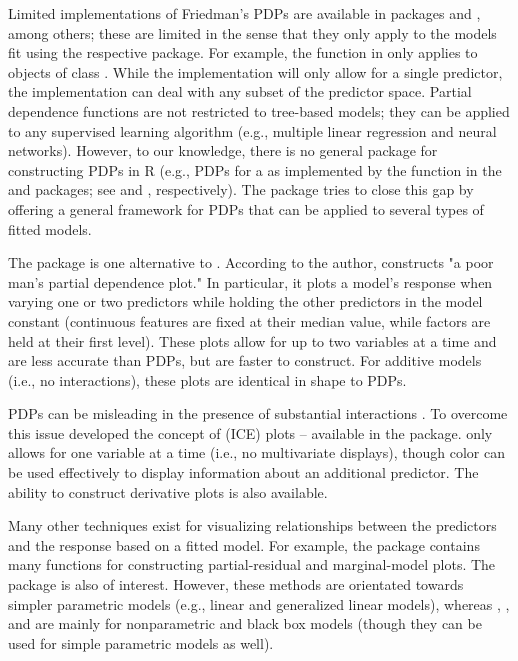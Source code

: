 Limited implementations of Friedman's PDPs are available in packages  \citep{randomForest-pkg} and , among others; these are limited in the sense that they only apply to the models fit using the respective package. For example, the  function in  only applies to objects of class . While the  implementation will only allow for a single predictor, the  implementation can deal with any subset of the predictor space. Partial dependence functions are not restricted to tree-based models; they can be applied to any supervised learning algorithm (e.g., multiple linear regression and neural networks). However, to our knowledge, there is no general package for constructing PDPs  in R (e.g., PDPs for a  as implemented by the  function in the  and  packages; see \citet{party-pkg} and \citet{partykit-pkg}, respectively). The  \citep{pdp-pkg} package tries to close this gap by offering a general framework for PDPs that can be applied to several types of fitted models.

The  package \citep{plotmo-pkg} is one alternative to . According to the author,  constructs "a poor man's partial dependence plot." In particular, it plots a model's response when varying one or two predictors while holding the other predictors in the model constant (continuous features are fixed at their median value, while factors are held at their first level). These plots allow for up to two variables at a time and are less accurate than PDPs, but are faster to construct. For additive models (i.e., no interactions), these plots are identical in shape to PDPs.

PDPs can be misleading in the presence of substantial interactions \citep{goldstein-peeking-2015}. To overcome this issue \citeauthor*{goldstein-peeking-2015} developed the concept of  (ICE) plots -- available in the  package.  only allows for one variable at a time (i.e., no multivariate displays), though color can be used effectively to display information about an additional predictor. The ability to construct derivative plots is also available.

Many other techniques exist for visualizing relationships between the predictors and the response based on a fitted model. For example, the  package \citep{fox-car-2011} contains many functions for constructing partial-residual and marginal-model plots. The  package \citep{fox-effects-2003} is also of interest. However, these methods are orientated towards simpler parametric models (e.g., linear and generalized linear models), whereas , , and  are mainly for nonparametric and black box models (though they can be used for simple parametric models as well).


